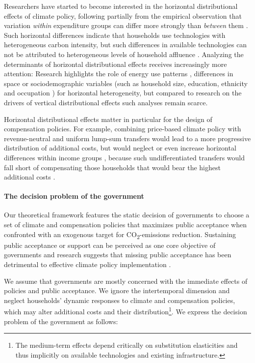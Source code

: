 \documentclass[12pt, a4paper]{article}
\begin{document}
Researchers have started to become interested in the horizontal distributional effects of climate policy, following partially from the empirical observation that variation \textit{within} expenditure groups can differ more strongly than \textit{between} them \autocite{Cronin.2019,Steckel.2021b,Pizer.2019}. Such horizontal differences indicate that households use technologies with heterogeneous carbon intensity, but such differences in available technologies can not be attributed to heterogeneous levels of household affluence \autocite{Hansel.2022}. Analyzing the determinants of horizontal distributional effects receives increasingly more attention: Research highlights the role of energy use patterns \autocite{Steckel.2021b,Missbach.2024}, differences in space \autocite{Chan.2023,Burtraw.2009} or sociodemographic variables (such as household size, education, ethnicity and occupation \autocite{Grainger.2010,Buchs.2013,Farrell.2017,Missbach.2023,Fremstad.2019}) for horizontal heterogeneity, but compared to research on the drivers of vertical distributional effects such analyses remain scarce.

Horizontal distributional effects matter in particular for the design of compensation policies. For example, combining price-based climate policy with revenue-neutral and uniform lump-sum transfers would lead to a more progressive distribution of additional costs, but would neglect or even increase horizontal differences within income groups \autocite{Cronin.2019,Hansel.2022}, because such undifferentiated transfers would fall short of compensating those households that would bear the highest additional costs \autocite{Fullerton.2019,Missbach.2024,Sallee.2019}.

\paragraph{The decision problem of the government}
Our theoretical framework features the static decision of governments to choose a set of climate and compensation policies that maximizes public acceptance when confronted with an exogenous target for CO\textsubscript{2}-emissions reduction. Sustaining public acceptance or support can be perceived as one core objective of governments and research suggests that missing public acceptance has been detrimental to effective climate policy implementation \autocite{Carattini.2018,Bergquist.2022,Douenne.2022}.

We assume that governments are mostly concerned with the immediate effects of policies and public acceptance. We ignore the intertemporal dimension and neglect households' dynamic responses to climate and compensation policies, which may alter additional costs and their distribution\footnote{The medium-term effects depend critically on substitution elasticities and thus implicitly on available technologies and existing infrastructure.}. We express the decision problem of the government as follows:  
\end{document}
